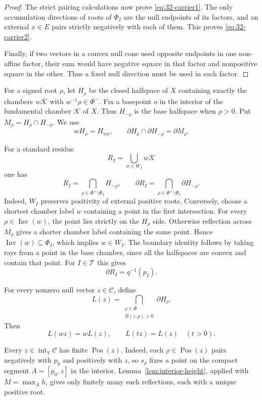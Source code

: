 \documentclass[11pt,reqno]{amsart}
\DeclareMathOperator{\Inv}{Inv}
\theoremstyle{plain}
\theoremstyle{definition}
\theoremstyle{remark}
\numberwithin{equation}{section}
\DeclareMathOperator{\Pos}{Pos}
\begin{document}
\begin{proof}
The strict pairing calculations now prove
\eqref{eq:32-carrier1}.
The only accumulation directions of roots of $\Phi_I$
are the null endpoints of its factors, and an external
$x\in E$ pairs strictly negatively with each of them.
This proves \eqref{eq:32-carrier2}.

Finally, if two vectors in a convex null cone used opposite
endpoints in one non-affine factor, their sum would have
negative square in that factor and nonpositive square
in the other.
Thus a fixed null direction must be used in each factor.
\end{proof}

For a signed root $\rho$, let $H_\rho$ be the closed
halfspace of $X$ containing exactly the chambers
$w\mathscr K$ with $w^{-1}\rho\in\Phi^-$. Fix a basepoint $o$ in the interior of the
fundamental chamber $\mathcal K$ of $X$.
Thus $H_{-\rho}$ is the base halfspace when $\rho>0$.
Put $M_\rho=H_\rho\cap H_{-\rho}$.
We use
\[
    wH_\rho=H_{w\rho},
    \qquad
    \partial H_\rho\cap\partial H_{-\rho}
    =\partial M_\rho.
\]

For a standard residue
\[
    R_I=\bigcup_{w\in W_I}w\mathscr K
\]
one has
\begin{equation}\label{eq:32-residue}
    R_I=
    \bigcap_{\rho\in\Phi^+\setminus\Phi_I}H_{-\rho},
    \qquad
    \partial R_I=
    \bigcap_{\rho\in\Phi^+\setminus\Phi_I}
    \partial H_{-\rho}.
\end{equation}
Indeed, $W_I$ preserves positivity of external positive roots.
Conversely, choose a shortest chamber label $w$ containing
a point in the first intersection.
For every $\rho\in\Inv(w)$, the point lies strictly on the
$H_\rho$ side.
Otherwise reflection across $M_\rho$ gives a shorter
chamber label containing the same point.
Hence $\Inv(w)\subseteq\Phi_I$, which implies $w\in W_I$.
The boundary identity follows by taking rays from a point
in the base chamber, since all the halfspaces are convex
and contain that point.
For $I\in\mathcal T$ this gives
\[
    \partial R_I=q^{-1}(p_I).
\]

For every nonzero null vector $z\in\mathcal C$, define
\[
    L(z)=
    \bigcap_{\substack{\rho\in\Phi\\B(z,\rho)>0}}
    \partial H_\rho.
\]
Then
\[
    L(wz)=wL(z),\qquad L(tz)=L(z)\quad(t>0).
\]

Every $z\in\operatorname{int}_V\mathcal C$ has finite $\Pos(z)$.
Indeed, each $\rho\in\Pos(z)$ pairs negatively with $p_0$ and positively
with $z$, so $s_\rho$ fixes a point on the compact segment $A=[p_0,z]$
in the interior. Lemma~\ref{lem:interior-height}, applied
with $M=\max_A h$, gives only finitely many such reflections, each with
a unique positive root.
\end{document}
